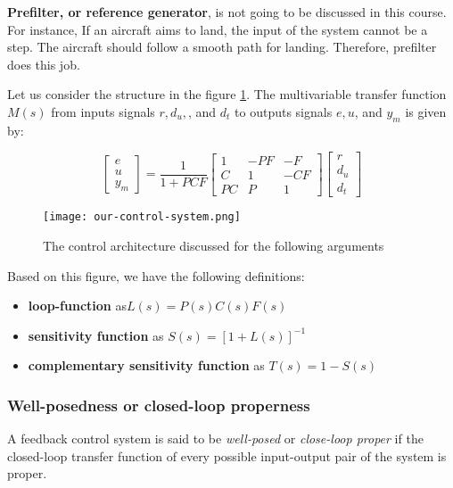 \textbf{Prefilter, or reference generator}, is not going to be discussed in this course. For instance, If an aircraft aims to land, the input of the system cannot be a step. The aircraft should follow a smooth path for landing. Therefore, prefilter does this job.

Let us consider the structure in the figure \ref{fig:our-control-system}. The multivariable transfer function \(M(s)\) from inputs signals \(r, d_u, \), and \(d_t\) to outputs signals \(e, u\), and \(y_m\) is given by:

\[
\begin{bmatrix}
e \\
u \\
y_m
\end{bmatrix}
=
\frac{1}{1 + PCF}
\begin{bmatrix}
1 & -PF & -F \\
C & 1 & -CF \\
PC & P & 1
\end{bmatrix}
\begin{bmatrix}
r \\
d_u \\
d_t
\end{bmatrix}
\]

\begin{figure}[H]
    \centering
    \texttt{[image: our-control-system.png]}
    \caption{The control architecture discussed for the following arguments}
    \label{fig:our-control-system}
\end{figure}

Based on this figure, we have the following definitions:
\begin{itemize}
    \item \textbf{loop-function} as\(L(s) = P(s)C(s)F(s)\)
    \item \textbf{sensitivity function} as \(S(s) =\left[1 + L(s)\right]^{-1}\)
    \item \textbf{complementary sensitivity function} as \(T(s) = 1- S(s)\)
\end{itemize}

\subsubsection{Well-posedness or closed-loop properness}
A feedback control system is said to be \textit{well-posed} or \textit{close-loop proper} if the closed-loop transfer function of every possible input-output pair of the system is proper.

